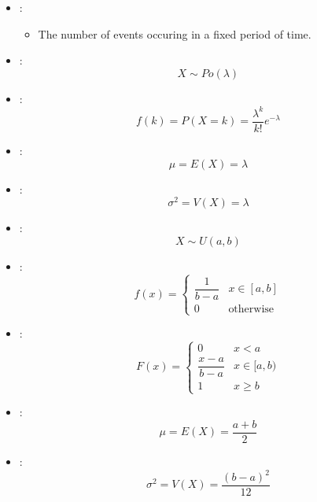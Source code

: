 \begin{multicols}{3}
    \begin{itemize}
      \item {}:
        \begin{itemize}
          \item The number of events occuring in a fixed period of time.
        \end{itemize}
      \item {}:
        \[
          X \sim Po(\lambda)
        \]
      \item {}:
        \[
          f(k) = P(X = k) = \frac{\lambda^k}{k!} e^{-\lambda}
        \]
      \item {}:
        \[
          \mu = E(X) = \lambda
        \]
      \item {}:
        \[
          \sigma^2 = V(X) = \lambda
        \]
    \end{itemize}


    \begin{itemize}
      \item {}:
        \[
          X \sim U(a, b)
        \]
      \item {}:
        \[
          f(x) =
            \begin{cases}
              \dfrac{1}{b - a} & x \in [a, b]\\
              0 & \text{otherwise}
            \end{cases}
        \]
      \item {}:
        \[
          F(x) =
            \begin{cases}
              0 & x < a \\
              \dfrac{x - a}{b - a} & x \in [a, b)\\
              1 & x \geq b
            \end{cases}
        \]
      \item {}:
        \[
          \mu = E(X) = \frac{a + b}{2}
        \]
      \item {}:
        \[
          \sigma^2 = V(X) = \frac{(b - a)^2}{12}
        \]
    \end{itemize}


\end{multicols}
